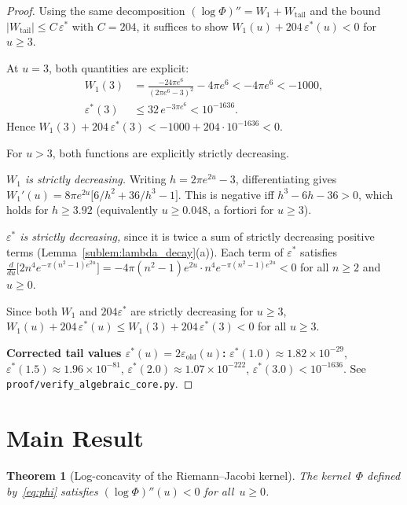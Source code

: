 \documentclass[11pt]{article}
\newtheorem{theorem}{Theorem}
\theoremstyle{definition}
\theoremstyle{remark}
\begin{document}
\begin{proof}
Using the same decomposition $(\log\Phi)'' = W_1 + W_{\mathrm{tail}}$ and the
bound $|W_{\mathrm{tail}}| \leq C\,\varepsilon^*$ with $C = 204$, it suffices to show
$W_1(u) + 204\,\varepsilon^*(u) < 0$ for $u \geq 3$.

At $u = 3$, both quantities are explicit:
\begin{align*}
W_1(3) &= \frac{-24\pi e^{6}}{(2\pi e^6 - 3)^2} - 4\pi e^6
  < -4\pi e^6 < -1000, \\[4pt]
\varepsilon^*(3) &\leq 32\,e^{-3\pi e^6} < 10^{-1636}.
\end{align*}
Hence $W_1(3) + 204\,\varepsilon^*(3) < -1000 + 204\cdot 10^{-1636} < 0$.

For $u > 3$, both functions are explicitly strictly decreasing.

\emph{$W_1$ is strictly decreasing.} Writing $h = 2\pi e^{2u}-3$, differentiating gives
$W_1'(u) = 8\pi e^{2u}\bigl[6/h^2 + 36/h^3 - 1\bigr]$.
This is negative iff $h^3 - 6h - 36 > 0$, which holds for $h \geq 3.92$
(equivalently $u \geq 0.048$, a fortiori for $u \geq 3$).

\emph{$\varepsilon^*$ is strictly decreasing,} since it is twice a sum of strictly
decreasing positive terms (Lemma~\ref{sublem:lambda_decay}(a)). Each term of $\varepsilon^*$ satisfies
$\tfrac{d}{du}\bigl[2n^4 e^{-\pi(n^2-1)e^{2u}}\bigr] = -4\pi(n^2-1)e^{2u}\cdot n^4 e^{-\pi(n^2-1)e^{2u}} < 0$
for all $n\geq 2$ and $u\geq 0$.

Since both $W_1$ and $204\varepsilon^*$ are strictly decreasing for $u \geq 3$,
$W_1(u) + 204\,\varepsilon^*(u) \leq W_1(3) + 204\,\varepsilon^*(3) < 0$ for all $u \geq 3$.

\textbf{Corrected tail values $\varepsilon^*(u) = 2\varepsilon_{\mathrm{old}}(u)$:} $\varepsilon^*(1.0) \approx 1.82\times 10^{-29}$,
$\varepsilon^*(1.5) \approx 1.96\times 10^{-81}$, $\varepsilon^*(2.0) \approx 1.07\times 10^{-222}$,
$\varepsilon^*(3.0) < 10^{-1636}$. See \texttt{proof/verify\_algebraic\_core.py}.
\end{proof}

\section{Main Result}
\label{sec:main}

\begin{theorem}[Log-concavity of the Riemann--Jacobi kernel]\label{thm:main}
The kernel~$\Phi$ defined by~\eqref{eq:phi} satisfies $(\log\Phi)''(u) < 0$ for all~$u \geq 0$.
\end{theorem}
\end{document}
